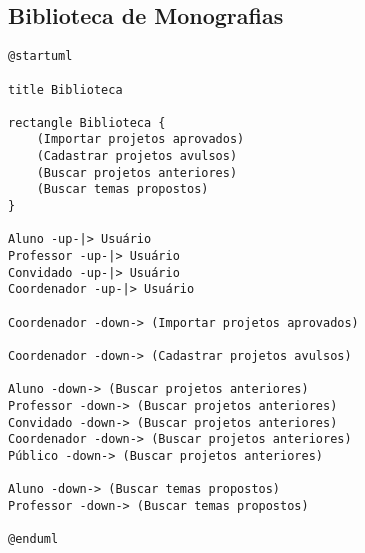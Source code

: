 \subsection{Biblioteca de Monografias}
\begin{lstlisting}[caption=Descrição do Diagrama de Casos de Uso da parte de Biblioteca de Monografias, label=bib-use-case-diagram]
@startuml

title Biblioteca

rectangle Biblioteca {
    (Importar projetos aprovados)
    (Cadastrar projetos avulsos)
    (Buscar projetos anteriores)
    (Buscar temas propostos)
}

Aluno -up-|> Usuário
Professor -up-|> Usuário
Convidado -up-|> Usuário
Coordenador -up-|> Usuário

Coordenador -down-> (Importar projetos aprovados)

Coordenador -down-> (Cadastrar projetos avulsos)

Aluno -down-> (Buscar projetos anteriores)
Professor -down-> (Buscar projetos anteriores)
Convidado -down-> (Buscar projetos anteriores)
Coordenador -down-> (Buscar projetos anteriores)
Público -down-> (Buscar projetos anteriores)

Aluno -down-> (Buscar temas propostos)
Professor -down-> (Buscar temas propostos)

@enduml
\end{lstlisting}